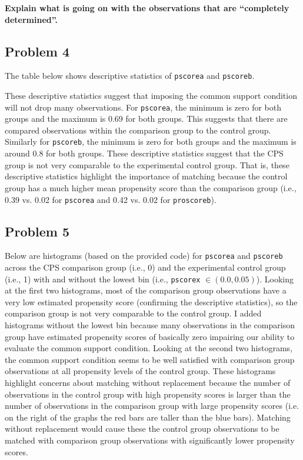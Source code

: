 \documentclass{article}
\begin{document}
\textbf{Explain what is going on with the observations that are “completely determined”.}

\pagebreak

\subsection*{Problem 4}

The table below shows descriptive statistics of \texttt{pscorea} and \texttt{pscoreb}.

\begin{center}

\end{center}

\begin{center}

\end{center}

These descriptive statistics suggest that imposing the common support condition will not drop many observations.  For \texttt{pscorea}, the minimum is zero for both groups and the maximum is 0.69 for both groups.  This suggests that there are compared observations within the comparison group to the control group.  Similarly for \texttt{pscoreb}, the minimum is zero for both groups and the maximum is around 0.8 for both groups. These descriptive statistics suggest that the CPS group is not very comparable to the experimental control group.  That is, these descriptive statistics highlight the importance of matching because the control group has a much higher mean propensity score than the comparison group (i.e., 0.39 vs. 0.02 for \texttt{pscorea} and 0.42 vs. 0.02 for \texttt{proscoreb}).

\subsection*{Problem 5}

Below are histograms (based on the provided code) for \texttt{pscorea} and \texttt{pscoreb} across the CPS comparison group (i.e., 0) and the experimental control group (i.e., 1) with and without the lowest bin (i.e., \texttt{pscorex} $\in (0.0, 0.05)$). Looking at the first two histograms, most of the comparison group observations have a very low estimated propensity score (confirming the descriptive statistics), so the comparison group is not very comparable to the control group. I added histograms without the lowest bin because many observations in the comparison group have estimated propensity scores of basically zero impairing our ability to evaluate the common support condition.  Looking at the second two histograms, the common support condition seems to be well satisfied with comparison group observations at all propensity levels of the control group. These histograms highlight concerns about matching without replacement because the number of observations in the control group with high propensity scores is larger than the number of observations in the comparison group with large propensity scores (i.e. on the right of the graphs the red bars are taller than the blue bars).  Matching without replacement would cause these the control group observations to be matched with comparison group observations with significantly lower propensity scores.
\end{document}
